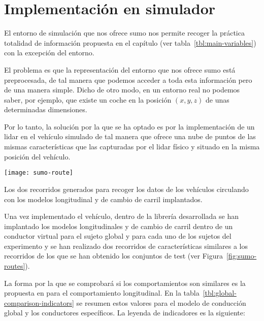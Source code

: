 \chapter{Implementación en simulador}
\label{ch:simulation-implementation}

El entorno de simulación que nos ofrece \ac{sumo} nos permite recoger la práctica totalidad de información propuesta en el capítulo  (ver tabla~\ref{tbl:main-variables}) con la excepción del entorno.

El problema es que la representación del entorno que nos ofrece \ac{sumo} está preprocesada, de tal manera que podemos acceder a toda esta información pero de una manera simple. Dicho de otro modo, en un entorno real no podemos saber, por ejemplo, que existe un coche en la posición $(x, y, z)$ de unas determinadas dimensiones.

Por lo tanto, la solución por la que se ha optado es por la implementación de un \ac{lidar} en el vehículo simulado de tal manera que ofrece una nube de puntos de las mismas características que las capturadas por el \ac{lidar} físico y situado en la misma posición del vehículo.

\begin{marginfigure}
	\centering
	\texttt{[image: sumo-route]}
	\caption[Dos recorridos de prueba en el entorno virtual]{Los dos recorridos generados para recoger los datos de los vehículos circulando con los modelos longitudinal y de cambio de carril implantados.}
	\label{fig:sumo-routes}
\end{marginfigure}

Una vez implementado el vehículo, dentro de la librería desarrollada se han implantado los modelos longitudinales y de cambio de carril dentro de un conductor virtual para el sujeto global y para cada uno de los sujetos del experimento y se han realizado dos recorridos de características similares a los recorridos de los que se han obtenido los conjuntos de test (ver Figura~\ref{fig:sumo-routes}).

La forma por la que se comprobará si los comportamientos son similares es la propuesta en \cite{DiazAlvarez2014} para el comportamiento longitudinal. En la tabla~\ref{tbl:global-comparison-indicators} se resumen estos valores para el modelo de conducción global y los conductores específicos. La leyenda de indicadores es la siguiente:

